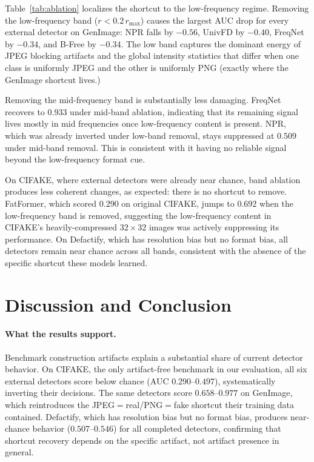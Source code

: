 \documentclass{article}
\begin{document}
Table~\ref{tab:ablation} localizes the shortcut to the low-frequency regime.
Removing the low-frequency band ($r < 0.2\,r_{\max}$) causes the largest AUC drop for every external detector on GenImage: NPR falls by $-0.56$, UnivFD by $-0.40$, FreqNet by $-0.34$, and B-Free by $-0.34$.
The low band captures the dominant energy of JPEG blocking artifacts and the global intensity statistics that differ when one class is uniformly JPEG and the other is uniformly PNG (exactly where the GenImage shortcut lives.)

Removing the mid-frequency band is substantially less damaging.
FreqNet recovers to $0.933$ under mid-band ablation, indicating that its remaining signal lives mostly in mid frequencies once low-frequency content is present.
NPR, which was already inverted under low-band removal, stays suppressed at $0.509$ under mid-band removal. This is consistent with it having no reliable signal beyond the low-frequency format cue.

On CIFAKE, where external detectors were already near chance, band ablation produces less coherent changes, as expected: there is no shortcut to remove.
FatFormer, which scored $0.290$ on original CIFAKE, jumps to $0.692$ when the low-frequency band is removed, suggesting the low-frequency content in CIFAKE's heavily-compressed $32\times32$ images was actively suppressing its performance.
On Defactify, which has resolution bias but no format bias, all detectors remain near chance across all bands, consistent with the absence of the specific shortcut these models learned.


\section{Discussion and Conclusion}
\label{sec:conclusion}

\paragraph{What the results support.}
Benchmark construction artifacts explain a substantial share of current detector behavior.
On CIFAKE, the only artifact-free benchmark in our evaluation, all six external detectors score below chance (AUC $0.290$--$0.497$), systematically inverting their decisions.
The same detectors score $0.658$--$0.977$ on GenImage, which reintroduces the JPEG$=$real/PNG$=$fake shortcut their training data contained.
Defactify, which has resolution bias but no format bias, produces near-chance behavior ($0.507$--$0.546$) for all completed detectors, confirming that shortcut recovery depends on the specific artifact, not artifact presence in general.
\end{document}
